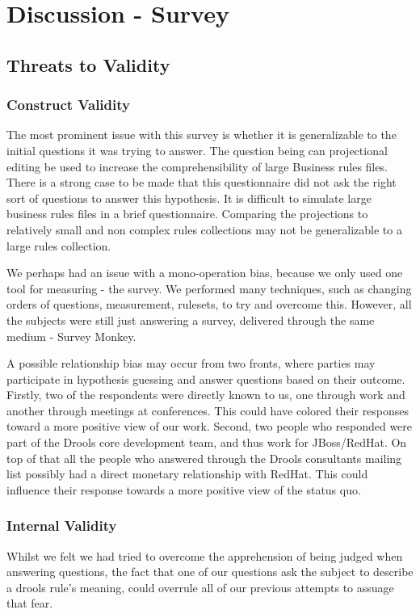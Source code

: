 \section{Discussion - Survey}

\subsection{Threats to Validity}  

\subsubsection{Construct Validity}
The most prominent issue with this survey is whether it is generalizable to the initial questions it was trying to answer.
The question being can projectional editing be used to increase the comprehensibility of large Business rules files.
There is a strong case to be made that this questionnaire did not ask the right sort of questions to answer this hypothesis.
It is difficult to simulate large business rules files in a brief questionnaire.
Comparing the projections to relatively small and non complex rules collections may not be generalizable to a large rules collection.

We perhaps had an issue with a mono-operation bias, because we only used one tool for measuring - the survey.
We performed many techniques, such as changing orders of questions, measurement, rulesets, to try and overcome this.
However, all the subjects were still just answering a survey, delivered through the same medium - Survey Monkey.

A possible relationship bias may occur from two fronts, where parties may participate in hypothesis guessing and answer questions based on their outcome.
Firstly, two of the respondents were directly known to us, one through work and another through meetings at conferences.
This could have colored their responses toward a more positive view of our work.
Second, two people who responded were part of the Drools core development team, and thus work for JBoss/RedHat.
On top of that all the people who answered through the Drools consultants mailing list possibly had a direct monetary relationship with RedHat.
This could influence their response towards a more positive view of the status quo.

\subsubsection{Internal Validity}
Whilst we felt we had tried to overcome the apprehension of being judged when answering questions, the fact that one of our questions ask the subject to describe a drools rule's meaning, could overrule all of our previous attempts to assuage that fear.

